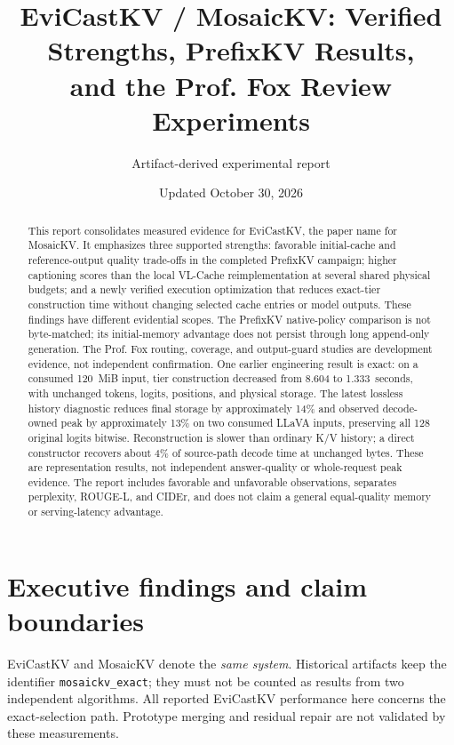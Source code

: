 \documentclass[10pt,letterpaper]{article}
\title{\textbf{EviCastKV / MosaicKV: Verified Strengths, PrefixKV Results,\\
and the Prof. Fox Review Experiments}}
\author{Artifact-derived experimental report}
\date{Updated October 30, 2026}
\newcommand{\Evi}{EviCastKV}
\begin{document}
\maketitle
\begin{abstract}
This report consolidates measured evidence for \Evi, the paper name for
MosaicKV. It emphasizes three supported strengths: favorable initial-cache
and reference-output quality trade-offs in the completed PrefixKV campaign;
higher captioning scores than the local VL-Cache reimplementation at several
shared physical budgets; and a newly verified execution optimization that
reduces exact-tier construction time without changing selected cache entries
or model outputs. These findings have different evidential scopes. The
PrefixKV native-policy comparison is not byte-matched; its initial-memory
advantage does not persist through long append-only generation. The
Prof. Fox routing, coverage, and output-guard studies are development evidence,
not independent confirmation. One earlier engineering result is exact:
on a consumed 120~MiB input, tier construction decreased from 8.604 to
1.333~seconds, with unchanged tokens, logits, positions, and physical storage.
The latest lossless history diagnostic reduces final storage by approximately
14\% and observed decode-owned peak by approximately 13\% on two consumed
LLaVA inputs, preserving all 128 original logits bitwise. Reconstruction is
slower than ordinary K/V history; a direct constructor recovers about 4\%
of source-path decode time at unchanged bytes. These are representation
results, not independent answer-quality or whole-request peak evidence.
The report includes favorable and unfavorable observations, separates
perplexity, ROUGE-L, and CIDEr, and does not claim a general equal-quality
memory or serving-latency advantage.
\end{abstract}
\tableofcontents

\section{Executive findings and claim boundaries}
\label{sec:summary}
\Evi{} and MosaicKV denote the \emph{same system}. Historical artifacts keep
the identifier \texttt{mosaickv\_exact}; they must not be counted as results
from two independent algorithms. All reported \Evi{} performance here concerns
the exact-selection path. Prototype merging and residual repair are not
validated by these measurements.
\end{document}
